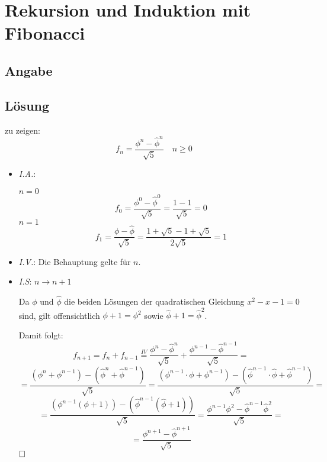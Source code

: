 \section*{Rekursion und Induktion mit Fibonacci}
\subsection*{Angabe}

\subsection*{Lösung}
\begin{flushenum}
\item
  zu zeigen:
  \[ f_n = \frac{\phi^n - \widehat{\phi}^n}{\sqrt{5}} \quad n \geq 0 \]
  \begin{itemize}
    \item \textit{I.A.}:

      $n = 0$
        \[ f_0 = \frac{\phi^0 - \widehat{\phi}^0}{\sqrt{5}} 
               = \frac{1 - 1}{\sqrt{5}} = 0 \]
      $n = 1$
        \[ f_1 = \frac{\phi - \widehat{\phi}}{\sqrt{5}} 
               = \frac{1 + \sqrt{5} - 1 + \sqrt{5}}{2 \sqrt{5}} = 1 \]
    \item \textit{I.V.}: Die Behauptung gelte für $n$.
    \item \textit{I.S}: $n \rightarrow n + 1$

    Da $\phi$ und $\widehat{\phi}$ die beiden Lösungen der quadratischen Gleichung
    $x^2 - x - 1 = 0$ sind, gilt offensichtlich $\phi + 1 = \phi^2$ sowie
    $\widehat{\phi} + 1 = \widehat{\phi}^2$.
    
    Damit folgt:
    \[ f_{n+1} = f_n + f_{n-1} \overset{IV}{=} \frac{\phi^n - \widehat{\phi}^n}{\sqrt{5}} + \frac{\phi^{n-1} - \widehat{\phi}^{n-1}}{\sqrt{5}} = \]
    \[ = \frac{(\phi^n + \phi^{n-1}) - (\widehat{\phi}^n + \widehat{\phi}^{n-1})}{\sqrt{5}}
       = \frac{(\phi^{n-1} \cdot \phi + \phi^{n-1}) - 
         (\widehat{\phi}^{n-1} \cdot \widehat{\phi} + \widehat{\phi}^{n-1})}{\sqrt{5}} = \]
    \[ = \frac{(\phi^{n-1} (\phi + 1)) - (\widehat{\phi}^{n-1} (\widehat{\phi} + 1))}{\sqrt{5}} 
       = \frac{\phi^{n-1} \phi^2 - \widehat{\phi}^{n-1} \widehat{\phi}^2}{\sqrt{5}} = \]
    \[ = \frac{\phi^{n+1} - \widehat{\phi}^{n+1}}{\sqrt{5}} \]
    $\hfill \square$
  \end{itemize}


\end{flushenum}
